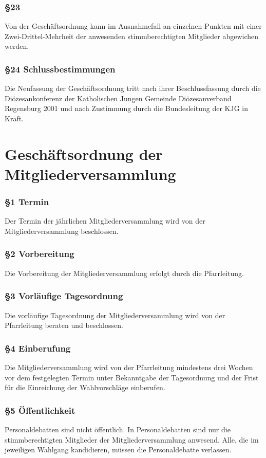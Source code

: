\documentclass[12pt]{report}
\begin{document}
\begin{flushleft}
\subsection*{§23}
Von der Geschäftsordnung kann im Ausnahmefall an einzelnen Punkten mit einer Zwei-Drittel-Mehrheit der
anwesenden stimmberechtigten Mitglieder abgewichen werden.
\subsection*{§24 Schlussbestimmungen}
Die Neufassung der Geschäftsordnung tritt nach ihrer Beschlussfassung durch die Diözesankonferenz der
Katholischen Jungen Gemeinde Diözesanverband Regensburg 2001 und nach Zustimmung durch die Bundesleitung
der KJG in Kraft.

\chapter*{Geschäftsordnung der Mitgliederversammlung}

\subsection*{§1 Termin}
Der Termin der jährlichen Mitgliederversammlung wird von der Mitgliederversammlung beschlossen.
\subsection*{§2 Vorbereitung}
Die Vorbereitung der Mitgliederversammlung erfolgt durch die Pfarrleitung.
\subsection*{§3 Vorläufige Tagesordnung}
Die vorläufige Tagesordnung der Mitgliederversammlung wird von der Pfarrleitung beraten und beschlossen.
\subsection*{§4 Einberufung}
Die Mitgliederversammlung wird von der Pfarrleitung mindestens drei Wochen vor dem festgelegten Termin
unter Bekanntgabe der Tagesordnung und der Frist für die Einreichung der Wahlvorschläge einberufen.
\subsection*{§5 Öffentlichkeit}
Personaldebatten sind nicht öffentlich. In Personaldebatten sind nur die stimmberechtigten Mitglieder der
Mitgliederversammlung anwesend. Alle, die im jeweiligen Wahlgang kandidieren, müssen die Personaldebatte
verlassen.

\end{flushleft}
\end{document}
